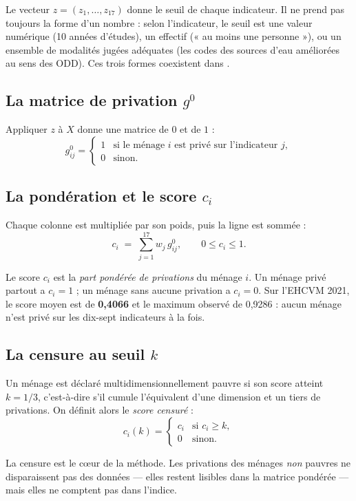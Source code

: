 \documentclass[11pt,a4paper]{article}
\begin{document}
Le vecteur $z = (z_1, \dots, z_{17})$ donne le seuil de chaque indicateur. Il ne prend pas
toujours la forme d'un nombre : selon l'indicateur, le seuil est une valeur numérique (10 années
d'études), un effectif (« au moins une personne »), ou un ensemble de modalités jugées adéquates
(les codes des sources d'eau améliorées au sens des ODD). Ces trois formes coexistent dans
.

\subsection{La matrice de privation $g^0$}

Appliquer $z$ à $X$ donne une matrice de $0$ et de $1$ :
\[
g^0_{ij} =
\begin{cases}
1 & \text{si le ménage } i \text{ est privé sur l'indicateur } j,\\
0 & \text{sinon.}
\end{cases}
\]

\subsection{La pondération et le score $c_i$}

Chaque colonne est multipliée par son poids, puis la ligne est sommée :
\[
c_i \;=\; \sum_{j=1}^{17} w_j \, g^0_{ij}, \qquad 0 \le c_i \le 1 .
\]

Le score $c_i$ est la \emph{part pondérée de privations} du ménage $i$. Un ménage privé partout a
$c_i = 1$ ; un ménage sans aucune privation a $c_i = 0$. Sur l'EHCVM 2021, le score moyen est de
\textbf{0,4066} et le maximum observé de 0,9286 : aucun ménage n'est privé sur les dix-sept
indicateurs à la fois.

\subsection{La censure au seuil \texorpdfstring{$k$}{k}}

Un ménage est déclaré multidimensionnellement pauvre si son score atteint $k = 1/3$, c'est-à-dire
s'il cumule l'équivalent d'une dimension et un tiers de privations. On définit alors le
\emph{score censuré} :
\[
c_i(k) =
\begin{cases}
c_i & \text{si } c_i \ge k,\\
0 & \text{sinon.}
\end{cases}
\]

La censure est le cœur de la méthode. Les privations des ménages \emph{non} pauvres ne
disparaissent pas des données --- elles restent lisibles dans la matrice pondérée --- mais elles
ne comptent pas dans l'indice.
\end{document}
